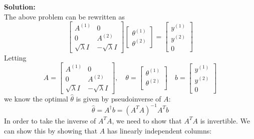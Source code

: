 \begin{enumerate}[label=(\alph*)]
\begin{enumerate}[label=(\alph*)]
		            \begin{tcolorbox}
			            \textbf{Solution:} \\
			            The above problem can be rewritten as
			            $$ \begin{bmatrix}
					            A^{(1)}          & 0                 \\
					            0                & A^{(2)}           \\
					            \sqrt{\lambda} I & -\sqrt{\lambda} I
				            \end{bmatrix}
				            \begin{bmatrix}
					            \theta^{(1)} \\
					            \theta^{(2)}
				            \end{bmatrix} =
				            \begin{bmatrix}
					            y^{(1)} \\
					            y^{(2)} \\
					            0
				            \end{bmatrix} $$
			            Letting
			            $$
				            A = \begin{bmatrix}
					            A^{(1)}          & 0                 \\
					            0                & A^{(2)}           \\
					            \sqrt{\lambda} I & -\sqrt{\lambda} I
				            \end{bmatrix},
				            \quad \theta =
				            \begin{bmatrix}
					            \theta^{(1)} \\
					            \theta^{(2)} \\
				            \end{bmatrix}
				            \quad b =
				            \begin{bmatrix}
					            y^{(1)} \\
					            y^{(2)} \\
					            0\end{bmatrix}
			            $$
			            we know the optimal $\hat{\theta}$ is given by
			            pseudoinverse of $A$:
			            $$ \hat{\theta} = A^{\dagger} b = \left( A^TA
				            \right)^{-1}A^Tb $$
			            In order to take the inverse of $A^TA$, we need to show that
			            $A^TA$ is invertible. We can show this by showing
			            that $A$ has linearly independent columns:

\end{tcolorbox}
\end{enumerate}
\end{enumerate}
